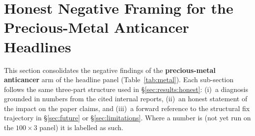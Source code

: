%
%
%
%

\section{Honest Negative Framing for the Precious-Metal Anticancer Headlines}
\label{sec:honest-negative}

This section consolidates the negative findings of the
\textbf{precious-metal anticancer} arm of the headline panel
(Table~\ref{tab:metal}).  Each sub-section follows the same three-part
structure used in \S\ref{sec:results:honest}: (i)~a diagnosis grounded in
\MEASURED{} numbers from the cited internal reports, (ii)~an honest
statement of the impact on the paper claims, and (iii)~a forward
reference to the structural fix trajectory in
\S\ref{sec:future} or \S\ref{sec:limitations}.  Where a number is
\PROJECTED{} (not yet run on the $100{\times}3$ panel) it is labelled
as such.

